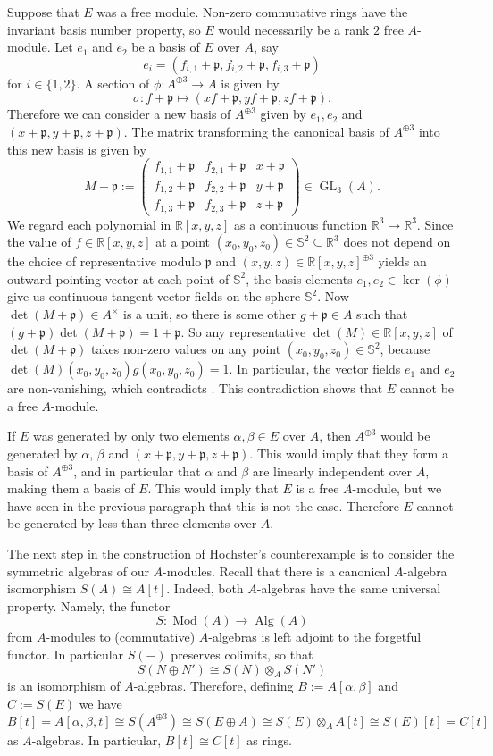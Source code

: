 \documentclass[A4paper, 12pt, british, reqno]{amsart}
\newcommand{\R}{\mathbb{R}} %
\newcommand{\bbS}{\mathbb{S}}
\newcommand{\p}{\mathfrak{p}}
\theoremstyle{plain}
\theoremstyle{definition}
\theoremstyle{remark}
\theoremstyle{plain}
\theoremstyle{definition}
\theoremstyle{remark}
\theoremstyle{plain}
\theoremstyle{definition}
\theoremstyle{remark}
\newcommand{\ot}{\otimes}
\newcommand{\op}{\oplus}
\begin{document}
Suppose that $E$ was a free module.
Non-zero commutative rings have the invariant basis number property, so $E$ would necessarily be a rank $2$ free $A$-module.
Let $e_{1}$ and $e_{2}$ be a basis of $E$ over $A$, say
\[ e_{i}=(f_{i,1}+\p,f_{i,2}+\p,f_{i,3}+\p) \]
for $i\in \{1,2\}$.
A section of $\phi\colon A^{\op 3}\to A$ is given by
\[ \sigma\colon f+\p \longmapsto (xf+\p,yf+\p,zf+\p). \]
Therefore we can consider a new basis of $A^{\op 3}$ given by $e_{1},e_{2}$ and $(x+\p,y+\p,z+\p)$.
The matrix transforming the canonical basis of $A^{\op 3}$ into this new basis is given by
\[ M+\p:=\begin{pmatrix} f_{1,1}+\p & f_{2,1}+\p & x+\p \\
    f_{1,2}+\p & f_{2,2}+\p & y+\p \\
    f_{1,3}+\p & f_{2,3}+\p & z+\p
\end{pmatrix} \in \operatorname{GL}_{3}(A). \]
We regard each polynomial in $\R[x,y,z]$ as a continuous function $\R^{3}\to \R^{3}$.
Since the value of $f\in \R[x,y,z]$ at a point $(x_{0},y_{0},z_{0})\in \bbS^{2}\subseteq \R^{3}$ does not depend on the choice of representative modulo $\p$ and $(x,y,z)\in \R[x,y,z]^{\op 3}$ yields an outward pointing vector at each point of $\bbS^{2}$, the basis elements $e_{1},e_{2}\in \ker(\phi)$ give us continuous tangent vector fields on the sphere $\bbS^{2}$.
Now $\det(M+\p)\in A^{\times}$ is a unit, so there is some other $g+\p\in A$ such that $(g+\p)\det(M+\p)=1+\p$.
So any representative $\det(M)\in\R[x,y,z]$ of $\det(M+\p)$ takes non-zero values on any point $(x_{0},y_{0},z_{0})\in \bbS^{2}$, because $\det(M)(x_{0},y_{0},z_{0})g(x_{0},y_{0},z_{0})=1$.
In particular, the vector fields $e_{1}$ and $e_{2}$ are non-vanishing, which contradicts .
This contradiction shows that $E$ cannot be a free $A$-module.

If $E$ was generated by only two elements $\alpha,\beta\in E$ over $A$, then $A^{\op 3}$ would be generated by $\alpha$, $\beta$ and $(x+\p,y+\p,z+\p)$.
This would imply that they form a basis of $A^{\op 3}$, and in particular that $\alpha$ and $\beta$ are linearly independent over $A$, making them a basis of $E$.
This would imply that $E$ is a free $A$-module, but we have seen in the previous paragraph that this is not the case.
Therefore $E$ cannot be generated by less than three elements over $A$.

The next step in the construction of Hochster's counterexample is to consider the symmetric algebras of our $A$-modules.
Recall that there is a canonical $A$-algebra isomorphism $S(A)\cong A[t]$.
Indeed, both $A$-algebras have the same universal property.
Namely, the functor
\[ S\colon \operatorname{Mod}(A)\to \operatorname{Alg}(A) \]
from $A$-modules to (commutative) $A$-algebras is left adjoint to the forgetful functor.
In particular $S(-)$ preserves colimits, so that
\[ S(N\op N')\cong S(N)\ot_{A}S(N') \]
is an isomorphism of $A$-algebras.
Therefore, defining $B:=A[\alpha,\beta]$ and $C:=S(E)$ we have
\[ B[t]= A[\alpha,\beta,t]\cong S(A^{\op 3})\cong S(E\op A)\cong S(E)\ot_{A}A[t] \cong S(E)[t]=C[t] \]
as $A$-algebras.
In particular, $B[t]\cong C[t]$ as rings.
\end{document}
